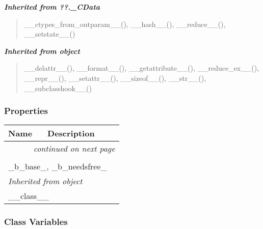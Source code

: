 \large{\textbf{\textit{Inherited from ??.\_CData}}}

\begin{quote}
\_\_ctypes\_from\_outparam\_\_(), \_\_hash\_\_(), \_\_reduce\_\_(), \_\_setstate\_\_()
\end{quote}

\large{\textbf{\textit{Inherited from object}}}

\begin{quote}
\_\_delattr\_\_(), \_\_format\_\_(), \_\_getattribute\_\_(), \_\_reduce\_ex\_\_(), \_\_repr\_\_(), \_\_setattr\_\_(), \_\_sizeof\_\_(), \_\_str\_\_(), \_\_subclasshook\_\_()
\end{quote}


  \subsubsection{Properties}

    \vspace{-1cm}
\hspace{\varindent}\begin{longtable}{|p{\varnamewidth}|p{\vardescrwidth}|l}
\cline{1-2}
\cline{1-2} \centering \textbf{Name} & \centering \textbf{Description}& \\
\cline{1-2}
\endhead\cline{1-2}\multicolumn{3}{r}{\small\textit{continued on next page}}\\\endfoot\cline{1-2}
\endlastfoot\multicolumn{2}{|l|}{\textit{Inherited from ??.\_CData}}\\
\multicolumn{2}{|p{\varwidth}|}{\raggedright \_b\_base\_, \_b\_needsfree\_}\\
\cline{1-2}
\multicolumn{2}{|l|}{\textit{Inherited from object}}\\
\multicolumn{2}{|p{\varwidth}|}{\raggedright \_\_class\_\_}\\
\cline{1-2}
\end{longtable}



  \subsubsection{Class Variables}

